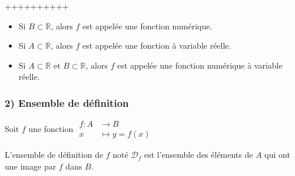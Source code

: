 \documentclass[12pt,a4paper]{article}
\begin{document}
++++++++++
\hrulefill

\begin{itemize}
    \item Si $B \subset \mathbb{R}$, alors $f$ est appelée une {\color{darkred}fonction numérique}.
    \item Si $A \subset \mathbb{R}$, alors $f$ est appelée une {\color{darkred}fonction à variable réelle}.
    \item Si $A \subset \mathbb{R}$ et $B \subset \mathbb{R}$, alors $f$ est appelée une {\color{darkred}fonction numérique à variable réelle}.
\end{itemize}
\subsubsection*{\color{darkgreen} 2) Ensemble de définition}

Soit {\color{darkred}$f$} une fonction \quad $\begin{aligned} f : A &\rightarrow B \\ x &\mapsto y = f(x) \end{aligned}$

L'{\color{darkred}ensemble de définition} de {\color{darkred}$f$} noté {\color{darkred}$\mathcal{D}_f$} est l'ensemble des éléments de {\color{darkred}$A$} qui ont une image par {\color{darkred}$f$} dans {\color{darkred}$B$}.
\end{document}
